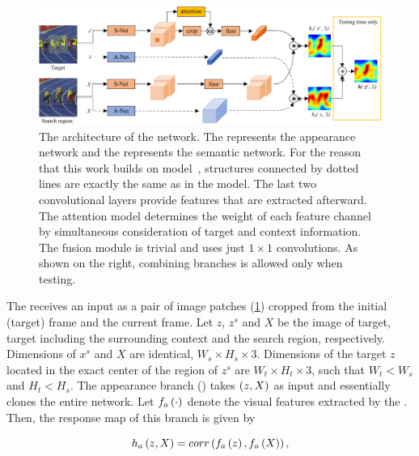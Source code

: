 \begin{figure}[t]
    \centerline{\includegraphics[width=\linewidth]{figures/theoretical_foundations/twofold_siamese_net_architecture.pdf}}
    \caption[ architecture]{The architecture of the  network. The  represents the appearance network and the  represents the semantic network. For the reason that this work builds on  model~\cite{Bertinetto2016}, structures connected by dotted lines are exactly the same as in the  model. The last two convolutional layers provide features that are extracted afterward. The attention model determines the weight of each feature channel by simultaneous consideration of target and context information. The fusion module is trivial and uses just $1 \times 1$ convolutions. As shown on the right, combining branches is allowed only when testing. }
    \label{fig:TwofoldSiameseNetArchitecture}
\end{figure}

The  receives an input as a pair of image patches (\cref{fig:TwofoldSiameseNetArchitecture}) cropped from the initial (target) frame and the current frame. Let $z$, $z^s$ and $X$ be the image of target, target including the surrounding context and the search region, respectively. Dimensions of $x^s$ and $X$ are identical, $W_s \times H_s \times 3$. Dimensions of the target $z$ located in the exact center of the region of $z^s$ are $W_t \times H_t \times 3$, such that $W_t < W_s$ and $H_t < H_s$. The appearance branch () takes $\left( {z, X} \right)$ as input and essentially clones the entire  network. Let ${f_a} \left( \cdot \right)$ denote the visual features extracted by the . Then, the response map of this branch is given by

\begin{equation}
    {h_a} \left( z, X \right) = {corr} \left( {f_a} \left( z \right), {f_a} \left( X \right) \right),
\end{equation}

